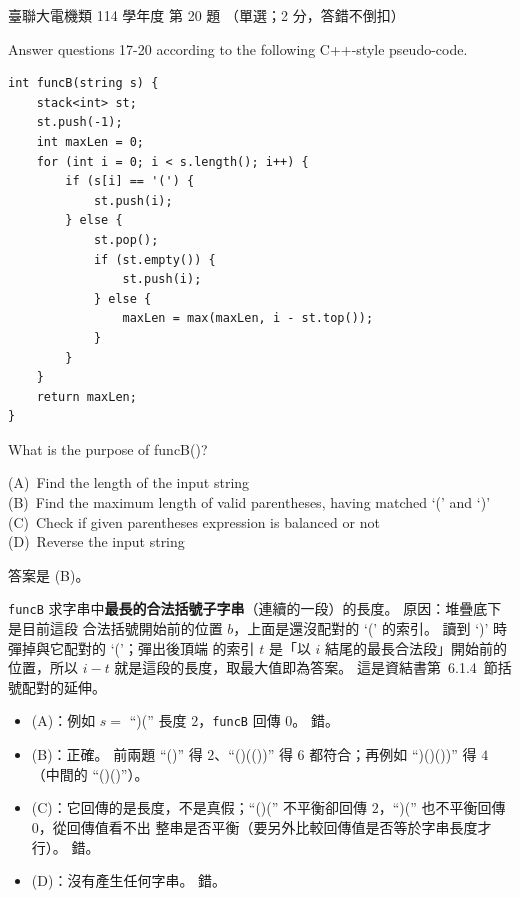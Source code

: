 \begin{pastexam}[label={px:ust-114-ee-ds-20}]{臺聯大電機類 114 學年度 第 20 題}
（單選；2 分，答錯不倒扣）

Answer questions 17-20 according to the following C++-style pseudo-code.
\begin{verbatim}
int funcB(string s) {
    stack<int> st;
    st.push(-1);
    int maxLen = 0;
    for (int i = 0; i < s.length(); i++) {
        if (s[i] == '(') {
            st.push(i);
        } else {
            st.pop();
            if (st.empty()) {
                st.push(i);
            } else {
                maxLen = max(maxLen, i - st.top());
            }
        }
    }
    return maxLen;
}
\end{verbatim}

What is the purpose of funcB()?

(A)~Find the length of the input string\\
(B)~Find the maximum length of valid parentheses, having matched `(' and `)'\\
(C)~Check if given parentheses expression is balanced or not\\
(D)~Reverse the input string
\end{pastexam}

\begin{pastsoln}
答案是 (B)。

\texttt{funcB} 求字串中\textbf{最長的合法括號子字串}（連續的一段）的長度。 原因：堆疊底下是目前這段
合法括號開始前的位置 $b$，上面是還沒配對的 `(' 的索引。 讀到 `)' 時彈掉與它配對的 `('；彈出後頂端
的索引 $t$ 是「以 $i$ 結尾的最長合法段」開始前的位置，所以 $i - t$ 就是這段的長度，取最大值即為答案。
這是資結書第~6.1.4~節括號配對的延伸。
\begin{itemize}
\item (A)：例如 $s =$ ``)('' 長度 $2$，\texttt{funcB} 回傳 $0$。 錯。
\item (B)：正確。 前兩題 ``()'' 得 $2$、``()(())'' 得 $6$ 都符合；再例如 ``)()())'' 得 $4$（中間的
``()()''）。
\item (C)：它回傳的是長度，不是真假；``()('' 不平衡卻回傳 $2$，``)('' 也不平衡回傳 $0$，從回傳值看不出
整串是否平衡（要另外比較回傳值是否等於字串長度才行）。 錯。
\item (D)：沒有產生任何字串。 錯。
\end{itemize}
\end{pastsoln}
